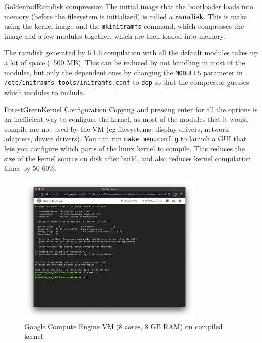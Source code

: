 \documentclass[12pt]{article}
\begin{document}
\begin{mybox}{Goldenrod}{Ramdisk compression}
The initial image that the bootloader loads into memory (before the filesystem
is initialized) is called a \textbf{ramdisk}. This is make using the kernel
image and the \texttt{mkinitramfs} command, which compresses the image and a
few modules together, which are then loaded into memory.

The ramdisk generated by 6.1.6 compilation with all the default modules takes 
up a lot of space (~500 MB). This can be reduced by not bundling in most of
the modules, but only the dependent ones by changing the \texttt{MODULES}
parameter in \texttt{/etc/initramfs-tools/initramfs.conf} to \texttt{dep} so 
that the compressor guesses which modules to include.
\end{mybox}

\begin{mybox}{ForestGreen}{Kernel Configuration}
Copying and pressing enter for all the options is an inefficient way to
configure the kernel, as most of the modules that it would compile are not used
by the VM (eg filesystems, display drivers, network adapters, device drivers).
You can run \texttt{make menuconfig} to launch a GUI that lets you configure
which parts of the linux kernel to compile. This reduces the size of the kernel
source on disk after build, and also reduces kernel compilation times by 50-60\%.
\end{mybox}

\vspace{1cm}

\begin{figure}[!htbp]
    \centering
    \includegraphics[width=0.8\textwidth]{gcp_vm.png}
    \caption{Google Compute Engine VM (8 cores, 8 GB RAM) on compiled kernel}
\end{figure}
\end{document}
